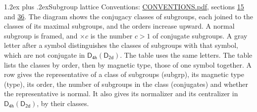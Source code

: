 \documentclass[10pt,a4paper]{article}
\makeatletter
\renewcommand\section{\@startsection{section}{1}{\z@}{-3ex plus -1ex minus -.2ex}%
  {1.2ex plus .2ex}{\normalfont\large\sffamily\bfseries\color{parttitle}}}
\numberwithin{equation}{section}
\newcommand{\grp}[1]{\mathsf{#1}}
\makeatother
\begin{document}
\section{Subgroup lattice}\label{s:subgroups}
Conventions: \href{../../CONVENTIONS.pdf}{CONVENTIONS.pdf}, sections \href{../../../rotation/CONVENTIONS.pdf\#conv.15}{15} and \href{../../CONVENTIONS.pdf\#conv.36}{36}.
The diagram shows the conjugacy classes of subgroups, each joined to the classes of its maximal subgroups, and the orders increase upward. \label{n:index.conjugates.c}\label{n:mark.conjugates}A normal subgroup is framed, and ${\times}c$ is the number $c > 1$ of conjugate subgroups. \label{n:mark.letter}A gray letter after a symbol distinguishes the classes of subgroups with that symbol, which are not conjugate in $\grp{D_{4h}}(\grp{D_{2d}})$. The table uses the same letters. The table lists the classes by order, then by magnetic type, those of one symbol together. \label{n:head.subgroup}\label{n:head.magnetic.type}\label{n:head.order}\label{n:head.conjugates}\label{n:head.normal}A row gives the representative of a class of subgroups (subgrp), its magnetic type (type), its order, the number of subgroups in the class (conjugates) and whether the representative is normal. \label{n:head.normalizer}\label{n:head.centralizer}It also gives its normalizer and its centralizer in $\grp{D_{4h}}(\grp{D_{2d}})$, by their classes. 
\end{document}

